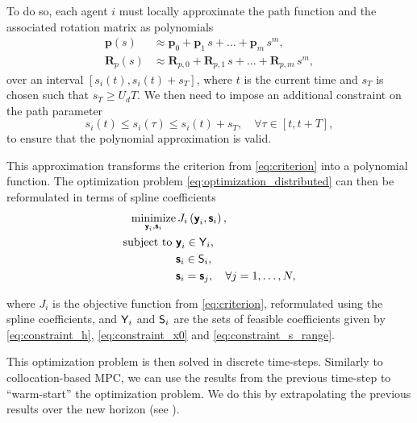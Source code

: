 To do so, each agent $i$ must locally approximate the path function and the associated rotation matrix as polynomials
\begin{align}
    \bm{p}(s) &\approx \bm{p}_0 + \bm{p}_1\,s + \ldots + \bm{p}_m\,s^m, \\
    \bm{R}_p(s) &\approx \bm{R}_{p,0} + \bm{R}_{p,1}\,s + \ldots + \bm{R}_{p,m}\,s^m,
\end{align}
over an interval $\left[s_i(t), s_i(t) + s_T\right]$, where $t$ is the current time and $s_T$ is chosen such that $s_T \geq U_d T$.
We then need to impose an additional constraint on the path parameter
\begin{equation}
    s_i(t) \leq s_i(\tau) \leq s_i(t) + s_T, \quad \forall \tau \in \left[t, t + T\right], \label{eq:constraint_s_range}
\end{equation}
to ensure that the polynomial approximation is valid.

This approximation transforms the criterion from \eqref{eq:criterion} into a polynomial function.
The optimization problem \eqref{eq:optimization_distributed} can then be reformulated in terms of spline coefficients 
\begin{subequations}
    \begin{align}
            \operatorname*{\mathrm{minimize}}_{\boldsymbol{\mathsf{y}}_i, \boldsymbol{\mathsf{s}}_i} &\, J_i\left(\boldsymbol{\mathsf{y}}_i, \boldsymbol{\mathsf{s}}_i\right), \\
        \text{subject to } & \boldsymbol{\mathsf{y}}_i \in \mathsf{Y}_i, \\
        & \boldsymbol{\mathsf{s}}_i \in \mathsf{S}_i, \\
        & \boldsymbol{\mathsf{s}}_i = \boldsymbol{\mathsf{s}}_j, \quad \forall j = 1, \ldots, N, \label{eq:s_constraint}
    \end{align} \label{eq:optimization_spline} 
\end{subequations}

\noindent where $J_i$ is the objective function from \eqref{eq:criterion}, reformulated using the spline coefficients, and $\mathsf{Y}_i$ and $\mathsf{S}_i$ are the sets of feasible coefficients given by \eqref{eq:constraint_h}, \eqref{eq:constraint_x0} and \eqref{eq:constraint_s_range}.

This optimization problem is then solved in discrete time-steps.
Similarly to collocation-based MPC, we can use the results from the previous time-step to ``warm-start'' the optimization problem.
We do this by extrapolating the previous results over the new horizon (see ).

